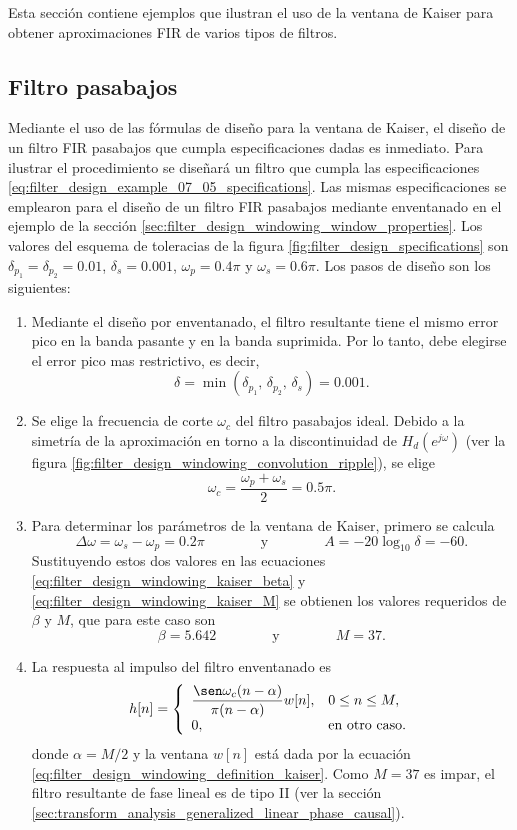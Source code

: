 \documentclass[a4paper]{report}
\begin{document}
Esta sección contiene ejemplos que ilustran el uso de la ventana de Kaiser para obtener aproximaciones FIR de varios tipos de filtros.

\subsection{Filtro pasabajos}\label{sec:filter_design_windowing_kaiser_low_pass_design}

Mediante el uso de las fórmulas de diseño para la ventana de Kaiser, el diseño de un filtro FIR pasabajos que cumpla especificaciones dadas es inmediato. Para ilustrar el procedimiento se diseñará un filtro que cumpla las especificaciones \ref{eq:filter_design_example_07_05_specifications}. Las mismas especificaciones se emplearon para el diseño de un filtro FIR pasabajos mediante enventanado en el ejemplo de la sección \ref{sec:filter_design_windowing_window_properties}. Los valores del esquema de toleracias de la figura \ref{fig:filter_design_specifications} son \(\delta_{p_1}=\delta_{p_2}=0.01\), \(\delta_s=0.001\), \(\omega_p=0.4\pi\) y \(\omega_s=0.6\pi\). Los pasos de diseño son los siguientes:
\begin{enumerate}
 \item Mediante el diseño por enventanado, el filtro resultante tiene el mismo error pico en la banda pasante y en la banda suprimida. Por lo tanto, debe elegirse el error pico mas restrictivo, es decir,
 \[
  \delta=\min(\delta_{p_1},\,\delta_{p_2},\,\delta_s)=0.001.
 \]
 \item Se elige la frecuencia de corte \(\omega_c\) del filtro pasabajos ideal. Debido a la simetría de la aproximación en torno  a la discontinuidad de \(H_d(e^{j\omega})\) (ver la figura \ref{fig:filter_design_windowing_convolution_ripple}), se elige
 \[
  \omega_c=\frac{\omega_p+\omega_s}{2}=0.5\pi.
 \]
 \item Para determinar los parámetros de la ventana de Kaiser, primero se calcula
 \[
  \Delta\omega=\omega_s-\omega_p=0.2\pi
  \qquad\qquad\textrm{y}\qquad\qquad
  A=-20\log_{10}\delta=-60.
 \]
 Sustituyendo estos dos valores en las ecuaciones \ref{eq:filter_design_windowing_kaiser_beta} y \ref{eq:filter_design_windowing_kaiser_M} se obtienen los valores  requeridos de \(\beta\) y \(M\), que para este caso son
 \[
  \beta=5.642
  \qquad\qquad\textrm{y}\qquad\qquad
  M=37.
 \]
 \item La respuesta al impulso del filtro enventanado es 
 \[
  h[n]=\left\{ 
   \begin{array}{ll}
     \dfrac{\sen\omega_c(n-\alpha)}{\pi(n-\alpha)}w[n], & 0\leq n\leq M,\\ 
     0, & \textrm{en otro caso.}
   \end{array}
   \right.
 \]
donde \(\alpha=M/2\) y la ventana \(w[n]\) está dada por la ecuación \ref{eq:filter_design_windowing_definition_kaiser}. Como \(M=37\) es impar, el filtro resultante de fase lineal es de tipo II (ver la sección  \ref{sec:transform_analysis_generalized_linear_phase_causal}). 
\end{enumerate}
\end{document}

